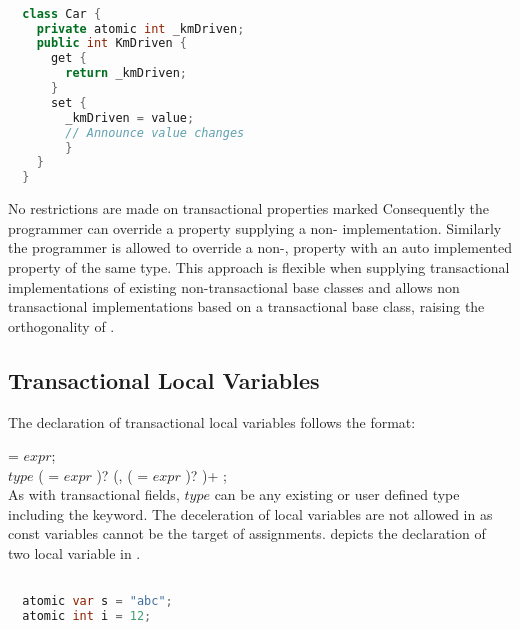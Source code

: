 \begin{lstlisting}[label=lst:atomic_property,
 caption={Manual Transactional Property},
 language=Java, 
 showspaces=false,
 showtabs=false,
 breaklines=true,
 showstringspaces=false,
 breakatwhitespace=true,
 commentstyle=\color{greencomments},
 keywordstyle=\color{bluekeywords},
 stringstyle=\color{redstrings},
 morekeywords={atomic, retry, orElse, var, get, set}]  % Start your code-block

  class Car {
    private atomic int _kmDriven;
    public int KmDriven {
      get {
        return _kmDriven;
      }
      set {
        _kmDriven = value;
        // Announce value changes
        }
    }
  }
\end{lstlisting}

No restrictions are made on transactional properties marked  Consequently the programmer can override a  property supplying a non- implementation. Similarly the programmer is allowed to override a non-,  property with an  auto implemented property of the same type. This approach is flexible when supplying transactional implementations of existing non-transactional base classes and allows non transactional implementations based on a transactional base class, raising the orthogonality of \stmname.

\subsection{Transactional Local Variables}\label{subsec:local_variables}
The declaration of transactional local variables follows the format:

   = $expr$;\\
 $type$  ( = $expr$ )? (,  ( = $expr$ )? )+ ;\\

As with transactional fields, $type$ can be any existing or user defined type including the  keyword. The deceleration of  local variables are not allowed in \stmname as const variables cannot be the target of assignments.  depicts the declaration of two  local variable in \stmname.
\begin{lstlisting}[label=lst:local_variable,
 caption={Local Transactional Variable},
 language=Java, 
 showspaces=false,
 showtabs=false,
 breaklines=true,
 showstringspaces=false,
 breakatwhitespace=true,
 commentstyle=\color{greencomments},
 keywordstyle=\color{bluekeywords},
 stringstyle=\color{redstrings},
 morekeywords={atomic, retry, orElse, var, get, set}]  % Start your code-block

  atomic var s = "abc";
  atomic int i = 12; 
\end{lstlisting}

